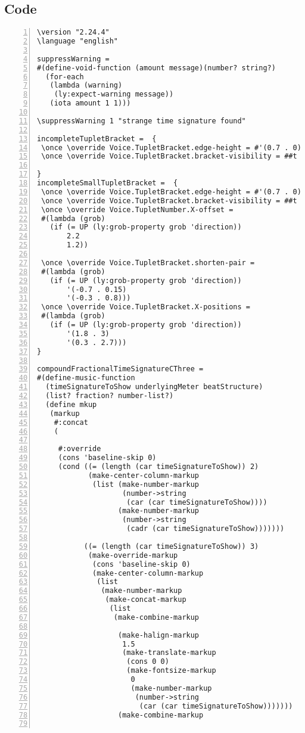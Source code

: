 \subsection{Code}
\begin{Verbatim}[numbers=left,xleftmargin=5mm]
\version "2.24.4"
\language "english"

suppressWarning =
#(define-void-function (amount message)(number? string?)
  (for-each
   (lambda (warning)
    (ly:expect-warning message))
   (iota amount 1 1)))

\suppressWarning 1 "strange time signature found"

incompleteTupletBracket =  {
 \once \override Voice.TupletBracket.edge-height = #'(0.7 . 0)
 \once \override Voice.TupletBracket.bracket-visibility = ##t

}
incompleteSmallTupletBracket =  {
 \once \override Voice.TupletBracket.edge-height = #'(0.7 . 0)
 \once \override Voice.TupletBracket.bracket-visibility = ##t
 \once \override Voice.TupletNumber.X-offset =
 #(lambda (grob)
   (if (= UP (ly:grob-property grob 'direction))
       2.2
       1.2))

 \once \override Voice.TupletBracket.shorten-pair =
 #(lambda (grob)
   (if (= UP (ly:grob-property grob 'direction))
       '(-0.7 . 0.15)
       '(-0.3 . 0.8)))
 \once \override Voice.TupletBracket.X-positions =
 #(lambda (grob)
   (if (= UP (ly:grob-property grob 'direction))
       '(1.8 . 3)
       '(0.3 . 2.7)))
}

compoundFractionalTimeSignatureCThree =
#(define-music-function
  (timeSignatureToShow underlyingMeter beatStructure)
  (list? fraction? number-list?)
  (define mkup
   (markup
    #:concat
    (

     #:override
     (cons 'baseline-skip 0)
     (cond ((= (length (car timeSignatureToShow)) 2)
            (make-center-column-markup
             (list (make-number-markup
                    (number->string
                     (car (car timeSignatureToShow))))
                   (make-number-markup
                    (number->string
                     (cadr (car timeSignatureToShow)))))))

           ((= (length (car timeSignatureToShow)) 3)
            (make-override-markup
             (cons 'baseline-skip 0)
             (make-center-column-markup
              (list
               (make-number-markup
                (make-concat-markup
                 (list
                  (make-combine-markup

                   (make-halign-markup
                    1.5
                    (make-translate-markup
                     (cons 0 0)
                     (make-fontsize-markup
                      0
                      (make-number-markup
                       (number->string
                        (car (car timeSignatureToShow)))))))
                   (make-combine-markup


\end{Verbatim}
